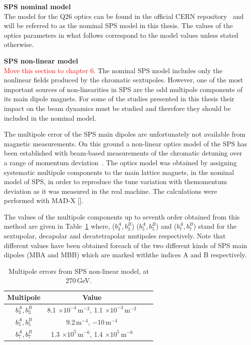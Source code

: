  \normalsize{\textbf{SPS nominal model}\\
 The model for the Q26 optics can be found in the official CERN repository~\cite{SPS_optics_repo} and will be referred to as the nominal SPS model in this thesis. The values of the optics parameters in what follows correspond to the model values unless stated otherwise.

 \normalsize{\textbf{SPS non-linear model}\\
\textcolor{red}{Move this section to chapter 6.}
The nominal SPS model includes only the nonlinear fields produced by the chromatic sextupoles. However, one of the most important sources of non-linearities in SPS are the odd multipole components of its main dipole magnets. For some of the studies presented in this thesis their impact on the beam dynamics must be studied and therefore they should be included in the nominal model. 

The multipole error of the SPS main dipoles are unfortunately not available from magnetic measurements. On this ground a non-linear optics model of the SPS has been established with beam-based measurements of the chromatic detuning over a range of momentum deviation~\cite{Carlà:2664976, Alekou:2640326}.  The optics model was obtained by assigning systematic multipole components to the main lattice magnets, in the nominal model of SPS, in order to reproduce the tune variation with themomentum deviation as it was measured in the real machine. The calculations were performed with MAD-X [].

The values of the multipole components up to seventh order obtained from this method are given in Table~\ref{tab:sps_mult_270GeV} where, ($b_3^A, b_3^B$) ($b_5^A, b_5^B$) and ($b_7^A, b_7^B$) stand for the sextupolar, decapolar and decatetrapolar mutipoles respectively. Note that different values have been obtained foreach of the two different kinds of SPS main dipoles (MBA and MBB) which are marked withthe indices A and B respectively.

\begin{table}[ht] %
    \caption{Multipole errors from SPS non-linear model, at 270\,GeV.} %
    \centering %
    \begin{tabular}{c c c c} %
    \hline\hline %
    Multipole & Value  \\ [0.5ex] %
    \hline  %
    $b_3^A, b_3^B$ & 8.1 $\times 10^{-4}$\,$\mathrm{m^{-2}}$, 1.1 $\times 10^{-3}$\,$\mathrm{m^{-2}}$\\ 
    $b_5^A, b_5^B$ & 9.2\,$\mathrm{m^{-4}}$, $-$10\,$\mathrm{m^{-4}}$ \\
    $b_7^A, b_7^B$ & 1.3 $\times 10^{5}$\,$\mathrm{m^{-6}}$, 1.4 $\times 10^{5}$\,$\mathrm{m^{-6}}$\\ [1ex] %
    \hline %
    \end{tabular}
    \label{tab:sps_mult_270GeV} %
    \end{table}


}}
